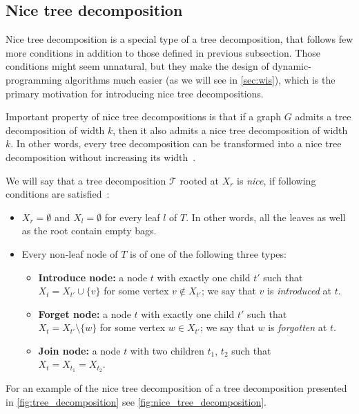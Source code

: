 \documentclass[thesis=B,english]{FITthesis}[2019/03/21]
\begin{document}
\subsection{Nice tree decomposition} \label{ssec:nice_tree_decomposition}
Nice tree decomposition is a special type of a tree decomposition, that follows few more conditions in addition to those defined in previous subsection. Those conditions might seem unnatural, but they make the design of dynamic-programming algorithms much easier (as we will see in \autoref{sec:wis}), which is the primary motivation for introducing nice tree decompositions.

Important property of nice tree decompositions is that if a graph $G$ admits a tree decomposition of width $k$, then it also admits a nice tree decomposition of width $k$. In other words, every tree decomposition can be transformed into a nice tree decomposition without increasing its width~\cite[Lemma 7.4]{param_algo}.

We will say that a tree decomposition $\mathcal{T}$ rooted at $X_r$ is \emph{nice}, if following conditions are satisfied~\cite[Chapter 7.2]{param_algo}:
\begin{itemize}
	\item $X_r = \emptyset$ and $X_l = \emptyset$ for every leaf $l$ of $T$. In other words, all the leaves as well as the root contain empty bags.
	\item Every non-leaf node of $T$ is of one of the following three types:
	\begin{itemize}
		\item \textbf{Introduce node:} a node $t$ with exactly one child $t'$ such that \\ $X_t = X_{t'} \cup \{v\}$ for some vertex $v \notin X_{t'}$; we say that $v$ is \emph{introduced} at $t$.
		\item \textbf{Forget node:} a node $t$ with exactly one child $t'$ such that \\ $X_t = X_{t'} \setminus \{w\}$ for some vertex $w \in X_{t'}$; we say that $w$ is \emph{forgotten} at $t$.
		\item \textbf{Join node:} a node $t$ with two children $t_1$, $t_2$ such that \\ $X_t = X_{t_1} = X_{t_2}$.
	\end{itemize}
\end{itemize}

For an example of the nice tree decomposition of a tree decomposition presented in \autoref{fig:tree_decomposition} see \autoref{fig:nice_tree_decomposition}.
\end{document}
